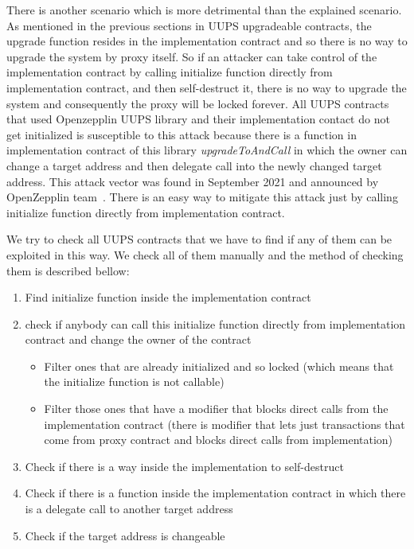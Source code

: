 There is another scenario which is more detrimental than the explained scenario. As mentioned in the previous sections in UUPS upgradeable contracts, the upgrade function resides in the implementation contract and so there is no way to upgrade the system by proxy itself. So if an attacker can take control of the implementation contract by calling initialize function directly from implementation contract, and then self-destruct it, there is no way to upgrade the system and consequently the proxy will be locked forever. All UUPS contracts that used Openzepplin UUPS library and their implementation contact do not get initialized is susceptible to this attack because there is a function in implementation contract of this library \textit{upgradeToAndCall} in which the owner can change a target address and then delegate call into the newly changed target address. This attack vector was found in September 2021 and announced by OpenZepplin team~\cite{securityAdvise}\cite{uupsAttacks}. There is an easy way to mitigate this attack just by calling initialize function directly from implementation contract. 

We try to check all UUPS contracts that we have to find if any of them can be exploited in this way. We check all of them manually and the method of checking them is described bellow:

\begin{enumerate}
  \item Find initialize function inside the implementation contract
  \item check if anybody can call this initialize function directly from implementation contract and change the owner of the contract
  \begin{itemize}
    \item Filter ones that are already initialized and so locked (which means that the initialize function is not callable)
    \item Filter those ones that have a modifier that blocks direct calls from the implementation contract (there is modifier that lets just transactions that come from proxy contract and blocks direct calls from implementation)
  \end{itemize}
  \item Check if there is a way inside the implementation to self-destruct 
  \item Check if there is a function inside the implementation contract in which there is a delegate call to another target address
  \item Check if the target address is changeable 
\end{enumerate}

